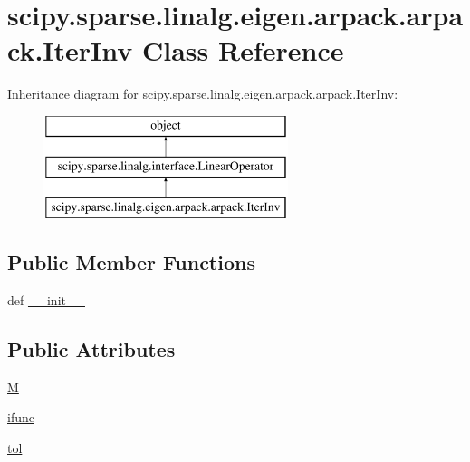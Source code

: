 \hypertarget{classscipy_1_1sparse_1_1linalg_1_1eigen_1_1arpack_1_1arpack_1_1IterInv}{}\section{scipy.\+sparse.\+linalg.\+eigen.\+arpack.\+arpack.\+Iter\+Inv Class Reference}
\label{classscipy_1_1sparse_1_1linalg_1_1eigen_1_1arpack_1_1arpack_1_1IterInv}
Inheritance diagram for scipy.\+sparse.\+linalg.\+eigen.\+arpack.\+arpack.\+Iter\+Inv\+:\begin{figure}[H]
\begin{center}
\leavevmode
\includegraphics[height=3.000000cm]{classscipy_1_1sparse_1_1linalg_1_1eigen_1_1arpack_1_1arpack_1_1IterInv}
\end{center}
\end{figure}
\subsection*{Public Member Functions}
\begin{DoxyCompactItemize}
\item 
def \hyperlink{classscipy_1_1sparse_1_1linalg_1_1eigen_1_1arpack_1_1arpack_1_1IterInv_a50bc2a47baf7b8b19ca85dc746e1e115}{\+\_\+\+\_\+init\+\_\+\+\_\+}
\end{DoxyCompactItemize}
\subsection*{Public Attributes}
\begin{DoxyCompactItemize}
\item 
\hyperlink{classscipy_1_1sparse_1_1linalg_1_1eigen_1_1arpack_1_1arpack_1_1IterInv_a5a7c207aff348a195a7ee171b732665d}{M}
\item 
\hyperlink{classscipy_1_1sparse_1_1linalg_1_1eigen_1_1arpack_1_1arpack_1_1IterInv_a8f133c68ecd1787427c2415705e84533}{ifunc}
\item 
\hyperlink{classscipy_1_1sparse_1_1linalg_1_1eigen_1_1arpack_1_1arpack_1_1IterInv_af6274d129bfb2e90ae503417f4d08618}{tol}
\end{DoxyCompactItemize}


